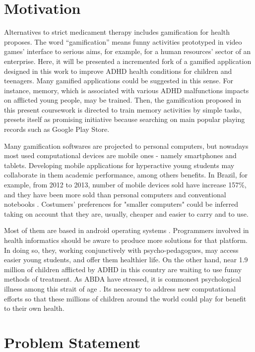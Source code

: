   
\section{Motivation}
\label{sc:motivation}

Alternatives to strict medicament therapy includes gamification for health proposes. The word ``gamification'' means funny activities prototyped in video games' interface to serious aims, for example, for a human resources' sector of an enterprise. Here, it will be presented a incremented fork of a gamified application designed in this work to improve ADHD health conditions for children and teenagers. Many gamified applications could be suggested in this sense. For instance, memory, which is associated with various ADHD malfunctions impacts on afflicted young people, may be trained. Then, the gamification proposed in this present coursework is directed to train memory activities by simple tasks, presets itself as promising initiative because searching on main popular playing records such as Google Play Store.

Many gamification softwares are projected to personal computers, but nowadays most used computational devices are mobile ones - namely smartphones and tablets. Developing mobile applications for hyperactive young students may collaborate in them academic performance, among others benefits. In Brazil, for example, from 2012 to 2013, number of mobile devices sold have increase 157\%, and they have been more sold than personal computers and conventional notebooks \citep{Villa}. Costumers' preferences for "smaller computers" could be inferred taking on account that they are, usually, cheaper and easier to carry and to use.  

Most of them are based in android operating systems . Programmers involved in health informatics should be aware to produce more solutions for that platform. In doing so, they, working conjunctively with psycho-pedagogues, may access easier young students, and offer them healthier life. On the other hand, near 1.9 million of children afflicted by ADHD in this country are waiting to use funny methods of treatment. As ABDA have stressed, it is commonest psychological illness among this strait of age  \citep{Villa}. Its necessary to address new computational efforts so that these millions of children around the world could play for benefit to their own health.


\section{Problem Statement}
\label{sc:problem} 

